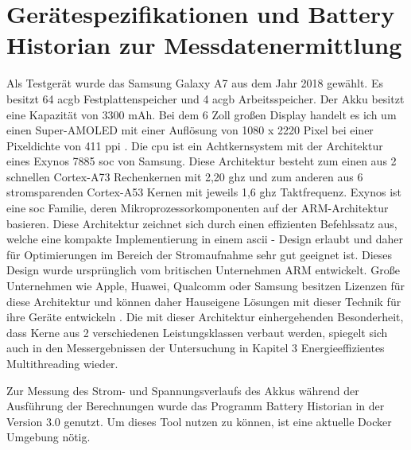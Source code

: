 \section{Gerätespezifikationen und Battery Historian zur Messdatenermittlung}

Als Testgerät wurde das Samsung Galaxy A7 aus dem Jahr 2018 gewählt. Es besitzt 64 ac{gb} Festplattenspeicher und 4 ac{gb} Arbeitsspeicher. Der Akku besitzt eine Kapazität von 3300 \ac{mAh}. Bei dem 6 Zoll großen Display handelt es ich um einen Super-AMOLED mit einer Auflösung von 1080 x 2220 Pixel bei einer Pixeldichte von 411 \ac{ppi} \cite{smartphone-data}. Die \ac{cpu} ist ein Achtkernsystem mit der Architektur eines Exynos 7885 \ac{soc} von Samsung.  Diese Architektur besteht zum einen aus 2 schnellen Cortex-A73 Rechenkernen mit 2,20 \ac{ghz} und zum anderen aus 6 stromsparenden Cortex-A53 Kernen mit jeweils 1,6 \ac{ghz} Taktfrequenz. Exynos ist eine \ac{soc} Familie, deren Mikroprozessorkomponenten auf der ARM-Architektur basieren. Diese Architektur zeichnet sich durch einen effizienten Befehlssatz aus, welche eine kompakte Implementierung in einem \ac{ascii} - Design erlaubt und daher für Optimierungen im Bereich der Stromaufnahme sehr gut geeignet ist. Dieses Design wurde ursprünglich vom britischen Unternehmen ARM entwickelt. Große Unternehmen wie Apple, Huawei, Qualcomm oder Samsung besitzen Lizenzen für diese Architektur und können daher Hauseigene Lösungen mit dieser Technik für ihre Geräte entwickeln \cite{cpu-data}. Die mit dieser Architektur einhergehenden Besonderheit, dass Kerne aus 2 verschiedenen Leistungsklassen verbaut werden, spiegelt sich auch in den Messergebnissen der Untersuchung in Kapitel 3 \glqq Energieeffizientes Multithreading\grqq{} wieder. 

Zur Messung des Strom- und Spannungsverlaufs des Akkus während der Ausführung der Berechnungen wurde das Programm Battery Historian in der Version 3.0 genutzt. Um dieses Tool nutzen zu können, ist eine aktuelle Docker Umgebung nötig. 

